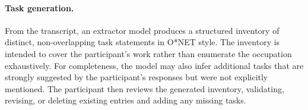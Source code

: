 \paragraph{Task generation.}

From the transcript, an extractor model produces a structured inventory of distinct, non-overlapping task statements in O*NET style. The inventory is intended to cover the participant's work rather than enumerate the occupation exhaustively. For completeness, the model may also infer additional tasks that are strongly suggested by the participant's responses but were not explicitly mentioned. The participant then reviews the generated inventory, validating, revising, or deleting existing entries and adding any missing tasks.